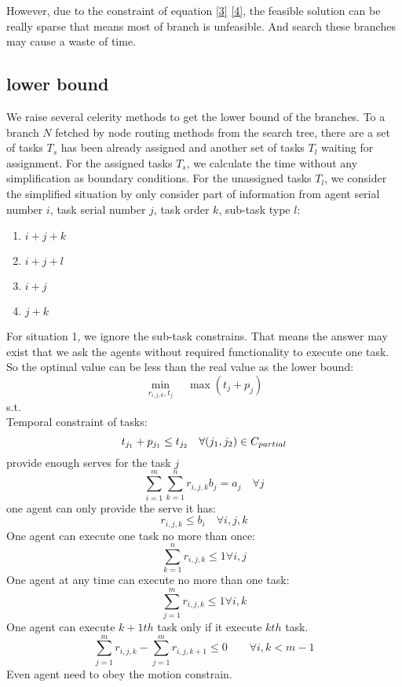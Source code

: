 \documentclass[10pt, Oct]{IEEEtran}
\begin{document}
However, due to the constraint of equation \ref{3} \ref{4}, the feasible solution can be really sparse that means most of branch is unfeasible. And search these branches may cause a waste of time. 

\subsection{lower bound}

We raise several celerity methods to get the lower bound of the branches. To a branch $N$ fetched by node routing methods from the search tree, there are a set of tasks $T_s$ has been already assigned and another set of tasks $T_l$ waiting for assignment. For the assigned tasks $T_s$, we calculate the time without any simplification as boundary conditions. 
For the unassigned tasks $T_l$, we consider the simplified situation by only consider part of information from agent serial number $i$, task serial number $j$, task order $k$, sub-task type $l$:
\begin{enumerate}
	\item $i + j+k$  
	\item $i+j+l$
	\item $i+j$
	\item $j+k$
\end{enumerate}
For situation 1, we ignore the sub-task constrains. That means the answer may exist that we ask the agents without required functionality to execute one task. So the optimal value can be less than the real value as the lower bound:
 $$\min_{r_{i,j,k}, t_j} \quad \max(t_j+p_j)$$
 s.t.\\
 
 Temporal constraint of tasks:
 \begin{equation}
 t_{j_1}+p_{j_1}\leq t_{j_2} \quad  \forall (j_1,j_2)\in C_{partial}\\
 \end{equation}
 provide enough serves for the task $j$ 
 \begin{equation}
 \sum_{i=1}^{m}\sum_{k=1}^{n}r_{i,j,k}b_{j}= a_{j}   \quad \forall j
 \end{equation}
 one agent can only provide the serve it has:
 \begin{equation}
 r_{i,j,k}\leq b_{i}   \quad \forall i,j,k
 \label{3}
 \end{equation}
 One agent can execute one task no more than once:
 \begin{equation}
 \sum_{k=1}^{n}r_{i,j,k} \leq 1   \forall i,j
 \end{equation}
 One agent at any time can execute no more than one task:
 \begin{equation}
 \sum_{j=1}^{m}r_{i,j,k} \leq 1    \forall i,k
 \end{equation}
 One agent can execute $k+1th$ task only if it execute $kth$ task.
 \begin{equation}
 \sum_{j=1}^{m}r_{i,j,k} - \sum_{j=1}^{m}r_{i,j,k+1}\leq  0    \qquad\forall i,k<m-1
 \end{equation}
 Even agent need to obey the motion constrain.
 
\end{document}
